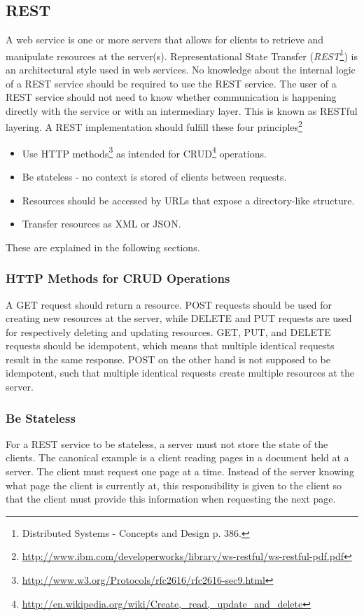 \subsection{REST \label{sec:REST}}
A web service is one or more servers that allows for clients to retrieve and manipulate resources at the server(s).  \newline
Representational State Transfer (\textit{REST}\footnote{Distributed Systems - Concepts and Design p. 386.}) is an architectural style used in web services. No knowledge about the internal logic of a REST service should be required to use the REST service. The user of a REST service should not need to know whether communication is happening directly with the service or with an intermediary layer. This is known as RESTful layering. \newline
A REST implementation should fulfill these four principles\footnote{\url{http://www.ibm.com/developerworks/library/ws-restful/ws-restful-pdf.pdf}} 

\begin{itemize}
\item Use HTTP methods\footnote{ \url{http://www.w3.org/Protocols/rfc2616/rfc2616-sec9.html}} as intended for CRUD\footnote{\url{http://en.wikipedia.org/wiki/Create,_read,_update_and_delete}} operations.
\item Be stateless - no context is stored of clients between requests. 
\item Resources should be accessed by URLs that expose a directory-like structure.
\item Transfer resources as XML or JSON.
\end{itemize}
These are explained in the following sections.

\subsubsection{HTTP Methods for CRUD Operations}
A GET request should return a resource. POST requests should be used for creating new resources at the server, while DELETE and PUT requests are used for respectively deleting and updating resources. GET, PUT, and DELETE requests should be idempotent, which means that multiple identical requests result in the same response. POST on the other hand is not supposed to be idempotent, such that multiple identical requests create multiple resources at the server.

\subsubsection{Be Stateless}
For a REST service to be stateless, a server must not store the state of the clients. The canonical example is a client reading pages in a document held at a server. The client must request one page at a time. Instead of the server knowing what page the client is currently at, this responsibility is given to the client so that the client must provide this information when requesting the next page. \\

